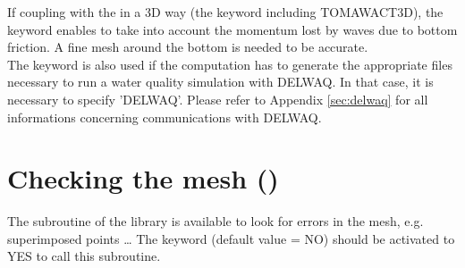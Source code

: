 If coupling with the \tomawac in a 3D way (the keyword 
including TOMAWACT3D), the keyword 
enables to take into account the momentum lost by waves due to
bottom friction.
A fine mesh around the bottom is needed to be accurate.\\

The keyword  is also used if the computation has to
generate the appropriate files necessary to run a water quality simulation with
DELWAQ. In that case, it is necessary to specify 'DELWAQ'. Please refer to Appendix \ref{sec:delwaq} for all informations
concerning communications with DELWAQ.

\section{Checking the mesh ()}

The subroutine  of the \bief library is available to look for
errors in the mesh, e.g. superimposed points \ldots
The keyword  (default value = NO) should be activated
to YES to call this subroutine.
